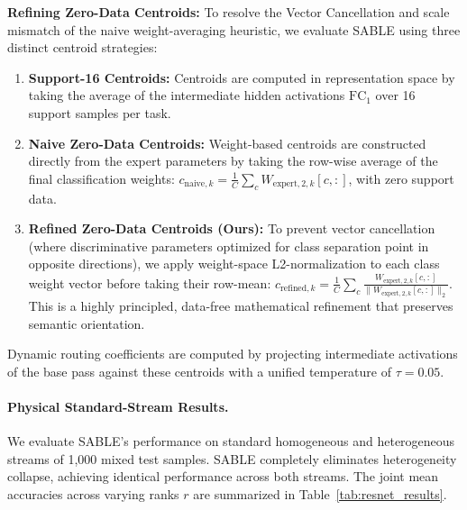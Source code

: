 \textbf{Refining Zero-Data Centroids:} To resolve the Vector Cancellation and scale mismatch of the naive weight-averaging heuristic, we evaluate SABLE using three distinct centroid strategies:
\begin{enumerate}
    \item \textbf{Support-16 Centroids:} Centroids are computed in representation space by taking the average of the intermediate hidden activations $\text{FC}_1$ over 16 support samples per task.
    \item \textbf{Naive Zero-Data Centroids:} Weight-based centroids are constructed directly from the expert parameters by taking the row-wise average of the final classification weights: $c_{\text{naive}, k} = \frac{1}{C}\sum_c W_{\text{expert}, 2, k}[c, :]$, with zero support data.
    \item \textbf{Refined Zero-Data Centroids (Ours):} To prevent vector cancellation (where discriminative parameters optimized for class separation point in opposite directions), we apply weight-space L2-normalization to each class weight vector before taking their row-mean: $c_{\text{refined}, k} = \frac{1}{C}\sum_c \frac{W_{\text{expert}, 2, k}[c, :]}{\|W_{\text{expert}, 2, k}[c, :]\|_2}$. This is a highly principled, data-free mathematical refinement that preserves semantic orientation.
\end{enumerate}
Dynamic routing coefficients are computed by projecting intermediate activations of the base pass against these centroids with a unified temperature of $\tau = 0.05$.

\paragraph{Physical Standard-Stream Results.} We evaluate SABLE's performance on standard homogeneous and heterogeneous streams of 1,000 mixed test samples. SABLE completely eliminates heterogeneity collapse, achieving identical performance across both streams. The joint mean accuracies across varying ranks $r$ are summarized in Table~\ref{tab:resnet_results}.

